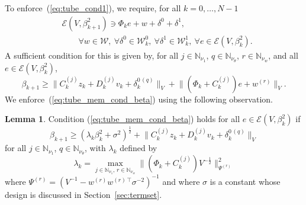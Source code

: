 \documentclass{IEEEtran}
\theoremstyle{definition}
\newtheorem{lemma}{Lemma}
\theoremstyle{remark}
\begin{document}
To enforce~(\ref{eq:tube_cond1}), we require, for all $k=0,\ldots,N-1$
\begin{align*}%
& \mathcal{E}(V, \beta_{k+1}^2) \ni \Phi_k e + w + \delta^0 + \delta^1 , \\ 
& \qquad \forall w \in \mathcal{W}, 
\ \forall \delta^0 \in \mathcal{W}^0_k, 
\ \forall \delta^1 \in \mathcal{W}^1_k, 
\ \forall e\in \mathcal{E}(V, \beta_k^2) .
\end{align*}
A sufficient condition for this is given by, for all $j\in\mathbb{N}_{\nu_{1}}$, $q\in\mathbb{N}_{\nu_\theta}$, $r\in\mathbb{N}_{\nu_w}$, and all $e\in\mathcal{E}(V,\beta_k^2)$,
\begin{equation}\label{eq:tube_mem_cond_beta} 
\beta_{k+1} \geq 
\lVert C^{(j)}_k z_k + D^{(j)}_k v_k + \delta^{0\,(q)}_k \rVert_V + \lVert (\Phi_k + C^{(j)}_k)e + w^{(r)}\rVert_V .
\end{equation}
We enforce~(\ref{eq:tube_mem_cond_beta}) using the following observation.

\begin{lemma}\label{lem:beta_mode1_dynamics}
Condition (\ref{eq:tube_mem_cond_beta}) holds for all $e\in\mathcal{E}(V,\beta_k^2)$ if
\begin{equation}
\beta_{k+1} \geq (\lambda_k \beta_k^2 + \sigma^2)^{\frac{1}{2}} + \lVert C^{(j)}_k z_k + D^{(j)}_k v_k + \delta^{0\,(q)}_k \rVert_V
\label{eq:beta_mode1_dynamics}
\end{equation}
for all $j\in\mathbb{N}_{\nu_{1}}$, $q\in\mathbb{N}_{\nu_\theta}$, with $\lambda_k$ defined by
\begin{equation}
\lambda_k = \max_{j\in\mathbb{N}_{\nu_1},\, r\in\mathbb{N}_{\nu_w}} \lVert
(\Phi_k + C_k^{(j)})V^{-\frac{1}{2}} \rVert_{\Psi^{(r)}}^2
\label{eq:lambda_mode1_def}
\end{equation}
where $\Psi^{(r)} = (V^{-1} - w^{(r)} w^{(r)\, \top} \sigma^{-2})^{-1}$ and where $\sigma$ is a constant whose design is discussed in Section~\ref{sec:termset}.
\end{lemma}
\end{document}
